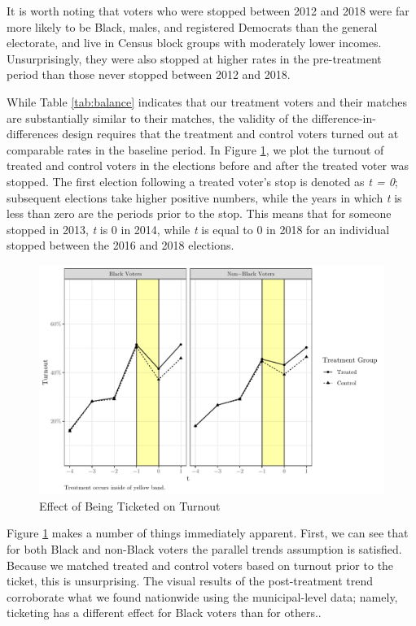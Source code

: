 \documentclass[
  12pt,
]{article}
\begin{document}
It is worth noting that voters who were stopped between 2012 and 2018 were far more likely to be Black, males, and registered Democrats than the general electorate, and live in Census block groups with moderately lower incomes. Unsurprisingly, they were also stopped at higher rates in the pre-treatment period than those never stopped between 2012 and 2018.

While Table \ref{tab:balance} indicates that our treatment voters and their matches are substantially similar to their matches, the validity of the difference-in-differences design requires that the treatment and control voters turned out at comparable rates in the baseline period. In Figure \ref{fig:did1}, we plot the turnout of treated and control voters in the elections before and after the treated voter was stopped. The first election following a treated voter's stop is denoted as \emph{t = 0}; subsequent elections take higher positive numbers, while the years in which \emph{t} is less than zero are the periods prior to the stop. This means that for someone stopped in 2013, \emph{t} is 0 in 2014, while \emph{t} is equal to 0 in 2018 for an individual stopped between the 2016 and 2018 elections.

\begin{figure}[H]

{\centering \includegraphics{draft_paper_files/figure-latex/did1-1} 

}

\caption{\label{fig:did-1}Effect of Being Ticketed on Turnout}\label{fig:did1}
\end{figure}

Figure \ref{fig:did1} makes a number of things immediately apparent. First, we can see that for both Black and non-Black voters the parallel trends assumption is satisfied. Because we matched treated and control voters based on turnout prior to the ticket, this is unsurprising. The visual results of the post-treatment trend corroborate what we found nationwide using the municipal-level data; namely, ticketing has a different effect for Black voters than for others..
\end{document}
